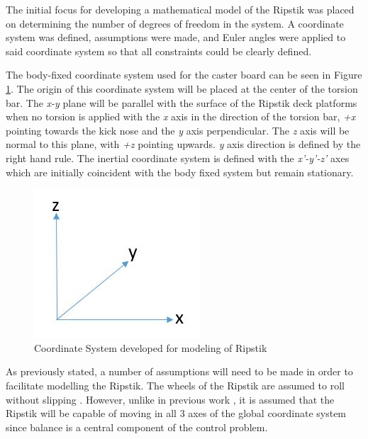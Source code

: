 The initial focus for developing a mathematical model of the Ripstik was placed on determining the number of degrees of freedom in the system. A coordinate system was defined, assumptions were made, and Euler angles were applied to said coordinate system so that all constraints could be clearly defined.
\par
The body-fixed coordinate system used for the caster board can be seen in Figure \ref{fig:Coordinate_System}. The origin of this coordinate system will be placed at the center of the torsion bar. The \textit{x-y} plane will be parallel with the surface of the Ripstik deck platforms when no torsion is applied with the \textit{x} axis in the direction of the torsion bar, \textit{+x} pointing towards the kick nose and the \textit{y} axis perpendicular. The \textit{z} axis will be normal to this plane, with \textit{+z} pointing upwards. \textit{y} axis direction is defined by the right hand rule. The inertial coordinate system is defined with the  \textit{x'-y'-z'} axes which are initially coincident with the body fixed system but remain stationary.
\begin{figure}[!htb]
\centering
{}
\includegraphics[width=\linewidth]{Coordinate_System.JPG}
\caption{Coordinate System developed for modeling of Ripstik}\label{fig:Coordinate_System}
\endminipage
\end{figure}
\par
As previously stated, a number of assumptions will need to be made in order to facilitate modelling the Ripstik. The wheels of the Ripstik are assumed to roll without slipping \cite{CasterboardRobot,BikeModel}. However, unlike in previous work \cite{CasterboardRobot}, it is assumed that the Ripstik will be capable of moving in all 3 axes of the global coordinate system since balance is a central component of the control problem.
